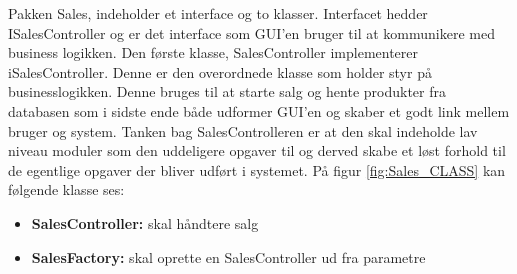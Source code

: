 
\newpage Pakken Sales, indeholder et interface og to klasser. Interfacet hedder ISalesController og er det interface som GUI'en bruger til at kommunikere med business logikken.
Den første klasse, SalesController implementerer iSalesController. Denne er den overordnede klasse som holder styr på businesslogikken. Denne bruges til at starte salg og hente produkter fra databasen som i sidste ende både udformer GUI'en og skaber et godt link mellem bruger og system. Tanken bag SalesControlleren er at den skal indeholde lav niveau moduler som den uddeligere opgaver til og derved skabe et løst forhold til de egentlige opgaver der bliver udført i systemet. På figur \ref{fig:Sales_CLASS} kan følgende klasse ses:

\begin{itemize}
	\item \textbf{SalesController: } skal håndtere salg
	\item \textbf{SalesFactory: } skal oprette en SalesController ud fra parametre
\end{itemize}